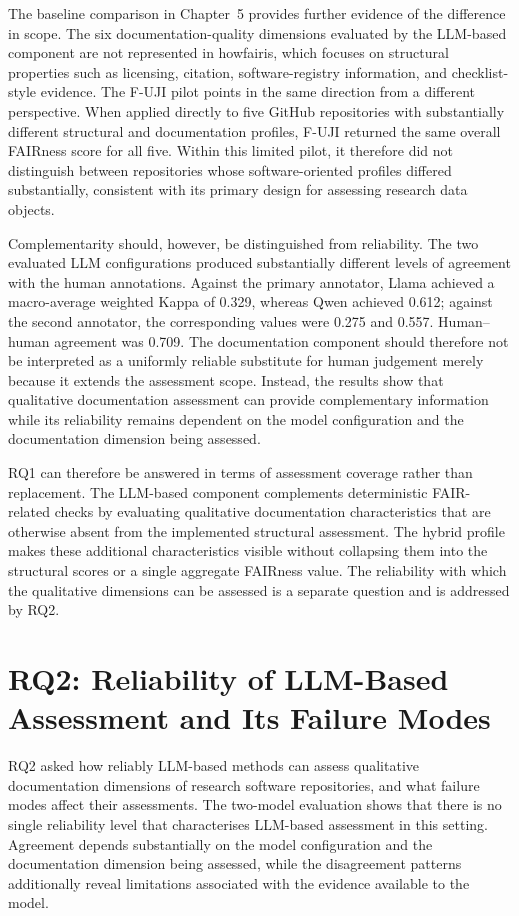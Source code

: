The baseline comparison in Chapter~5 provides further evidence of
the difference in scope. The six documentation-quality dimensions
evaluated by the LLM-based component are not represented in howfairis,
which focuses on structural properties such as licensing, citation,
software-registry information, and checklist-style evidence. The
F-UJI pilot points in the same direction from a different perspective.
When applied directly to five GitHub repositories with substantially
different structural and documentation profiles, F-UJI returned the
same overall FAIRness score for all five. Within this limited pilot,
it therefore did not distinguish between repositories whose
software-oriented profiles differed substantially, consistent with
its primary design for assessing research data objects.

Complementarity should, however, be distinguished from reliability.
The two evaluated LLM configurations produced substantially different
levels of agreement with the human annotations. Against the primary
annotator, Llama achieved a macro-average weighted Kappa of 0.329,
whereas Qwen achieved 0.612; against the second annotator, the
corresponding values were 0.275 and 0.557. Human--human agreement was
0.709. The documentation component should therefore not be interpreted
as a uniformly reliable substitute for human judgement merely because
it extends the assessment scope. Instead, the results show that
qualitative documentation assessment can provide complementary
information while its reliability remains dependent on the model
configuration and the documentation dimension being assessed.

RQ1 can therefore be answered in terms of assessment coverage rather
than replacement. The LLM-based component complements deterministic
FAIR-related checks by evaluating qualitative documentation
characteristics that are otherwise absent from the implemented
structural assessment. The hybrid profile makes these additional
characteristics visible without collapsing them into the structural
scores or a single aggregate FAIRness value. The reliability with
which the qualitative dimensions can be assessed is a separate
question and is addressed by RQ2.

\section{RQ2: Reliability of LLM-Based Assessment and Its Failure Modes}

RQ2 asked how reliably LLM-based methods can assess qualitative documentation
dimensions of research software repositories, and what failure modes affect
their assessments. The two-model evaluation shows that there is
no single reliability level that characterises LLM-based assessment
in this setting. Agreement depends substantially on the model
configuration and the documentation dimension being assessed, while
the disagreement patterns additionally reveal limitations associated
with the evidence available to the model.

